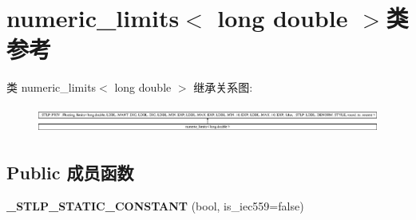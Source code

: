 \hypertarget{classnumeric__limits_3_01long_01double_01_4}{}\section{numeric\+\_\+limits$<$ long double $>$类 参考}
\label{classnumeric__limits_3_01long_01double_01_4}
类 numeric\+\_\+limits$<$ long double $>$ 继承关系图\+:\begin{figure}[H]
\begin{center}
\leavevmode
\includegraphics[height=0.895284cm]{classnumeric__limits_3_01long_01double_01_4}
\end{center}
\end{figure}
\subsection*{Public 成员函数}
\begin{DoxyCompactItemize}
\item 
\mbox{\label{classnumeric__limits_3_01long_01double_01_4_ac684dccc65eb6515f497b3de206b975a}} 
{\bfseries \+\_\+\+S\+T\+L\+P\+\_\+\+S\+T\+A\+T\+I\+C\+\_\+\+C\+O\+N\+S\+T\+A\+NT} (bool, is\+\_\+iec559=false)
\end{DoxyCompactItemize}
